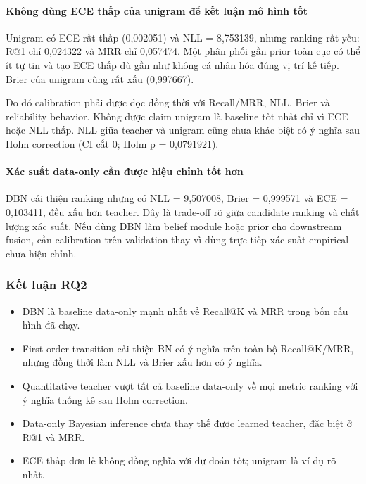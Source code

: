 \paragraph{Không dùng ECE thấp của unigram để kết luận mô hình tốt}

Unigram có ECE rất thấp (0,002051) và NLL = 8,753139, nhưng ranking rất yếu: R@1 chỉ 0,024322 và MRR chỉ 0,057474. Một phân phối gần prior toàn cục có thể ít tự tin và tạo ECE thấp dù gần như không cá nhân hóa đúng vị trí kế tiếp. Brier của unigram cũng rất xấu (0,997667).

Do đó calibration phải được đọc đồng thời với Recall/MRR, NLL, Brier và reliability behavior. Không được claim unigram là baseline tốt nhất chỉ vì ECE hoặc NLL thấp. NLL giữa teacher và unigram cũng chưa khác biệt có ý nghĩa sau Holm correction (CI cắt 0; Holm p = 0,0791921).

\paragraph{Xác suất data-only cần được hiệu chỉnh tốt hơn}

DBN cải thiện ranking nhưng có NLL = 9,507008, Brier = 0,999571 và ECE = 0,103411, đều xấu hơn teacher. Đây là trade-off rõ giữa candidate ranking và chất lượng xác suất. Nếu dùng DBN làm belief module hoặc prior cho downstream fusion, cần calibration trên validation thay vì dùng trực tiếp xác suất empirical chưa hiệu chỉnh.

\subsubsection*{Kết luận RQ2}

\begin{itemize}
\item DBN là baseline data-only mạnh nhất về Recall@K và MRR trong bốn cấu hình đã chạy.
\item First-order transition cải thiện BN có ý nghĩa trên toàn bộ Recall@K/MRR, nhưng đồng thời làm NLL và Brier xấu hơn có ý nghĩa.
\item Quantitative teacher vượt tất cả baseline data-only về mọi metric ranking với ý nghĩa thống kê sau Holm correction.
\item Data-only Bayesian inference chưa thay thế được learned teacher, đặc biệt ở R@1 và MRR.
\item ECE thấp đơn lẻ không đồng nghĩa với dự đoán tốt; unigram là ví dụ rõ nhất.
\end{itemize}

